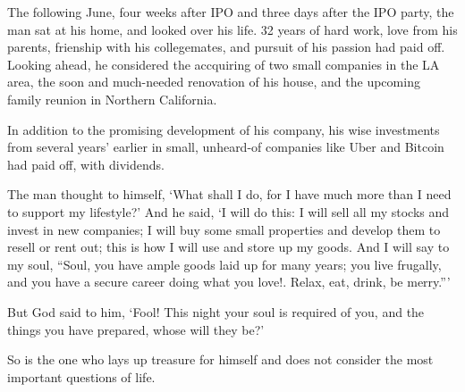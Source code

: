 \documentclass[a4paper,12pt,twoside]{book}
\begin{document}
The following June, four weeks after IPO and three days after the IPO party, the man sat at his home, and looked over his life.  32 years of hard work, love from his parents, frienship with his collegemates, and pursuit of his passion had paid off.  Looking ahead, he considered the accquiring of two small companies in the LA area, the soon and much-needed renovation of his house, and the upcoming family reunion in Northern California.  

In addition to the promising development of his company, his wise investments from several years' earlier in small, unheard-of companies like Uber and Bitcoin had paid off, with dividends.  

The man thought to himself, ‘What shall I do, for I have much more than I need to support my lifestyle?’ And he said, ‘I will do this: I will sell all my stocks and invest in new companies; I will buy some small properties and develop them to resell or rent out; this is how I will use and store up my goods.  And I will say to my soul, “Soul, you have ample goods laid up for many years; you live frugally, and you have a secure career doing what you love!.  Relax, eat, drink, be merry.”’ 


But God said to him, ‘Fool! This night your soul is required of you, and the things you have prepared, whose will they be?’ 

So is the one who lays up treasure for himself and does not consider the most important questions of life.
\end{document}
